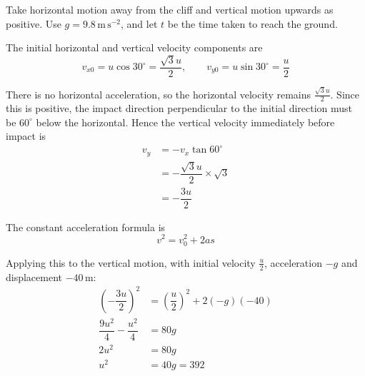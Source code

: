 \documentclass[leqno]{article}
\begin{document}
\begin{enumerate}[
  label=\textbf{\arabic*.},
  leftmargin=*,
  topsep=0pt,
  partopsep=0pt,
  parsep=0pt
]
\begin{djsSolution}
\begin{djsSolutionFigure}
\end{djsSolutionFigure}

Take horizontal motion away from the cliff and vertical motion upwards as positive. Use \(g=9.8\,\mathrm{m\,s^{-2}}\), and let \(t\) be the time taken to reach the ground.

The initial horizontal and vertical velocity components are
\[
v_{x0}=u\cos30^\circ=\dfrac{\sqrt{3}u}{2},
\qquad
v_{y0}=u\sin30^\circ=\dfrac{u}{2}
\]

There is no horizontal acceleration, so the horizontal velocity remains \(\frac{\sqrt{3}u}{2}\). Since this is positive, the impact direction perpendicular to the initial direction must be \(60^\circ\) below the horizontal. Hence the vertical velocity immediately before impact is
\begin{align*}
v_y&=-v_x\tan60^\circ\\
&=-\dfrac{\sqrt{3}u}{2}\times\sqrt{3}\\
&=-\dfrac{3u}{2}
\end{align*}

The constant acceleration formula is
\[
v^2=v_0^2+2as
\]

Applying this to the vertical motion, with initial velocity \(\frac{u}{2}\), acceleration \(-g\) and displacement \(-40\,\mathrm{m}\):
\begin{align*}
\left(-\dfrac{3u}{2}\right)^2
&=\left(\dfrac{u}{2}\right)^2+2(-g)(-40)\\
\dfrac{9u^2}{4}-\dfrac{u^2}{4}&=80g\\
2u^2&=80g\\
u^2&=40g=392
\end{align*}


\end{djsSolution}
\end{enumerate}
\end{document}
